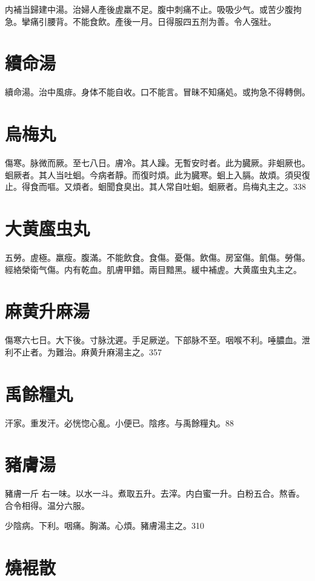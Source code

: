 \documentclass[12pt,twoside,UTF8,b5paper]{ctexbook}
\begin{document}
内補当歸建中湯。治婦人產後虗羸不足。腹中刺痛不止。吸吸少气。或苦少腹拘急。攣痛引腰背。不能食飲。產後一月。日得服四五剂为善。令人强壯。

\section{續命湯}

續命湯。治中風痱。身体不能自收。口不能言。冒昧不知痛処。或拘急不得轉側。

\section{烏梅丸}

傷寒。脉微而厥。至七八日。膚冷。其人躁。无暫安时者。此为臓厥。非蛔厥也。蛔厥者。其人当吐蛔。今病者靜。而復时煩。此为臓寒。蛔上入膈。故煩。須臾復止。得食而嘔。又煩者。蛔聞食臭出。其人常自吐蛔。蛔厥者。烏梅丸主之。338

\section{大黄䗪虫丸}

五勞。虗極。羸瘦。腹滿。不能飲食。食傷。憂傷。飲傷。房室傷。飢傷。勞傷。經絡榮衛气傷。内有乾血。肌膚甲錯。兩目黯黑。緩中補虗。大黄䗪虫丸主之。

\section{麻黄升麻湯}

傷寒六七日。大下後。{寸}脉沈遲。手足厥逆。下部脉不至。咽喉不利。唾膿血。泄利不止者。为難治。麻黄升麻湯主之。357

\section{禹餘糧丸}

汗家。重发汗。必恍惚心亂。小便已。陰疼。与禹餘糧丸。88

\section{豬膚湯}

豬膚{\scriptsize 一斤}
右一味。以水一斗。煮取五升。去滓。内白蜜一升。白粉五合。熬香。合令相得。温分六服。

少陰病。下利。咽痛。胸滿。心煩。豬膚湯主之。310

\section{燒裩散}
\end{document}
